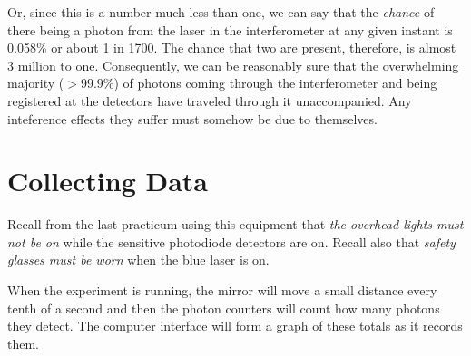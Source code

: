 Or, since this is a number much less than one, we can say that the \emph{chance} of there being a photon from the laser in the interferometer at any given instant is 0.058\% or about 1 in 1700. The chance that two are present, therefore, is almost 3 million to one. Consequently, we can be reasonably sure that the overwhelming majority ($> 99.9\%$) of photons coming through the interferometer and being registered at the detectors have traveled through it unaccompanied. Any inteference effects they suffer must somehow be due to themselves.

\section*{Collecting Data}

Recall from the last practicum using this equipment that \emph{the overhead lights must not be on} while the sensitive photodiode detectors are on.  Recall also that \emph{safety glasses must be worn} when the blue laser is on.

When the experiment is running, the mirror will move a small distance every tenth of a second and then the photon counters will count how many photons they detect. The computer interface will form a graph of these totals as it records them.

